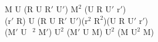 M U (R U $\text{R}'$ $\text{U}'$) $\text{M}^2$ (U R $\text{U}'$ $\text{r}'$)\\
($\text{r}'$ R) U (R U $\text{R}'$ $\text{U}'$)($\text{r}^2$ $\text{R}^2$)(U R $\text{U}'$ $\text{r}'$)\\
($\text{M}'$ U$\text{ }^2$ $\text{M}'$) $\text{U}^2$ ($\text{M}'$ U M) $\text{U}^2$ (M $\text{U}^2$ M)\\
